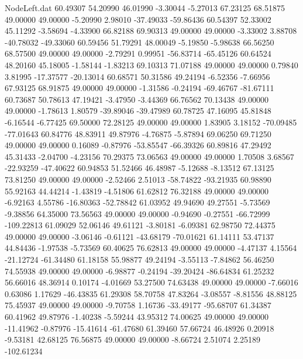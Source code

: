 \begin{filecontents}{NodeLeft.dat}
  60.49307   54.20990   46.01990    -3.30044   -5.27013   67.23125   68.51875   49.00000   49.00000   -5.20990    2.98010  -37.49033  -59.86436
  60.54397   52.33002   45.11292    -3.58694   -4.33900   66.82188   69.90313   49.00000   49.00000   -3.33002    3.88708  -40.78032  -49.33060
  60.59456   51.79291   48.00049    -5.19850   -5.98638   66.56250   68.57500   49.00000   49.00000   -2.79291    0.99951  -56.83714  -65.45126
  60.64524   48.20160   45.18005    -1.58144   -1.83213   69.10313   71.07188   49.00000   49.00000    0.79840    3.81995  -17.37577  -20.13014
  60.68571   50.31586   49.24194    -6.52356   -7.66956   67.93125   68.91875   49.00000   49.00000   -1.31586   -0.24194  -69.46767  -81.67111
  60.73687   50.78613   47.19421    -3.47950   -3.44369   66.76562   70.13438   49.00000   49.00000   -1.78613    1.80579  -39.89046  -39.47989
  60.78725   47.16095   45.81848    -6.16544   -6.77425   69.50000   72.28125   49.00000   49.00000    1.83905    3.18152  -70.09485  -77.01643
  60.84776   48.83911   49.87976    -4.76875   -5.87894   69.06250   69.71250   49.00000   49.00000    0.16089   -0.87976  -53.85547  -66.39326
  60.89816   47.29492   45.31433    -2.04700   -4.23156   70.29375   73.06563   49.00000   49.00000    1.70508    3.68567  -22.93259  -47.40622
  60.94853   51.52466   46.48987    -5.12688   -8.13512   67.13125   73.81250   49.00000   49.00000   -2.52466    2.51013  -58.74822  -93.21935
  60.98890   55.92163   44.44214    -1.43819   -4.51806   61.62812   76.32188   49.00000   49.00000   -6.92163    4.55786  -16.80363  -52.78842
  61.03952   49.94690   49.27551    -5.73569   -9.38856   64.35000   73.56563   49.00000   49.00000   -0.94690   -0.27551  -66.72999 -109.22813
  61.09029   52.06146   49.61121    -3.80181   -6.09381   62.98750   72.44375   49.00000   49.00000   -3.06146   -0.61121  -43.68179  -70.01621
  61.14111   53.47137   44.84436    -1.97538   -5.73569   60.40625   76.62813   49.00000   49.00000   -4.47137    4.15564  -21.12724  -61.34480
  61.18158   55.98877   49.24194    -3.55113   -7.84862   56.46250   74.55938   49.00000   49.00000   -6.98877   -0.24194  -39.20424  -86.64834
  61.25232   56.66016   48.36914     0.10174   -4.01669   53.27500   74.63438   49.00000   49.00000   -7.66016    0.63086    1.17629  -46.43835
  61.29308   58.70758   47.83264    -3.08557   -8.81556   48.88125   75.45937   49.00000   49.00000   -9.70758    1.16736  -33.49177  -95.68707
  61.34387   60.41962   49.87976    -1.40238   -5.59244   43.95312   74.00625   49.00000   49.00000  -11.41962   -0.87976  -15.41614  -61.47680
  61.39460   57.66724   46.48926     0.20918   -9.53181   42.68125   76.56875   49.00000   49.00000   -8.66724    2.51074    2.25189 -102.61234

\end{filecontents}
